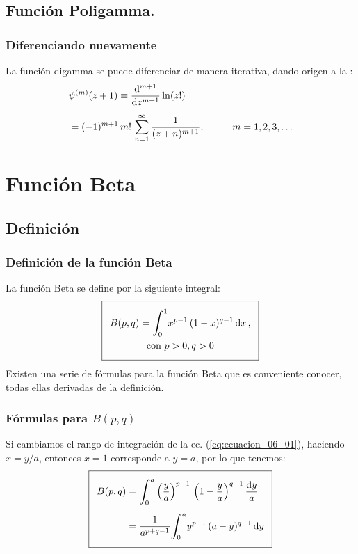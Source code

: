 \documentclass[12pt]{beamer}
\begin{document}
\subsection*{Función Poligamma.}

\begin{frame}
\frametitle{Diferenciando nuevamente}
La función digamma se puede diferenciar de manera iterativa, dando origen a la :
\pause
\begin{align}
\begin{aligned}
&{\psi}^{(m)} (z + 1) \equiv \dv[m+1]{z} \ln(z!) = \\[0.5em]
&= (-1)^{m+1} \, m! \,\sum_{n=1}^{\infty} \dfrac{1}{(z + n)^{m+1}}, \hspace{1cm} m = 1, 2, 3, \ldots
\end{aligned}
\label{eq:ecuacion_10_41}
\end{align}
\end{frame}
\section{Función Beta}
\subsection{Definición}
\begin{frame}[fragile]
\frametitle{Definición de la función Beta}
La función Beta se define por la siguiente integral:
\begin{align} \addtolength{\fboxsep}{5pt}\boxed{
\begin{gathered}
B(p, q) = \scaleint{6ex}_{\bs 0}^{1} x^{p-1} \, (1- x )^{q-1} \dd{x}, \\
\mbox{con }  p > 0, q > 0
\end{gathered}
}
\label{eq:ecuacion_06_01}
\end{align}
\pause
Existen una serie de fórmulas para la función Beta que es conveniente conocer, todas ellas derivadas de la definición.
\end{frame}
\begin{frame}
\frametitle{Fórmulas para $B(p, q)$}
Si cambiamos el rango de integración de la ec. (\ref{eq:ecuacion_06_01}), haciendo $x = y/a$, entonces $x = 1$ corresponde a $y = a$, por lo que tenemos:
\begin{align} \addtolength{\fboxsep}{5pt}\boxed{
\begin{aligned}
B (p, q) &= \scaleint{6ex}_{\bs 0}^{a} \left( \dfrac{y}{a}\right)^{p-1} \, \left( 1 - \dfrac{y}{a}\right)^{q-1} \dfrac{\dd{y}}{a} \\[0.5em]
&= \dfrac{1}{a^{p+q-1}} \scaleint{6ex}_{\bs 0}^{a} y^{p-1} \, (a - y)^{q-1} \dd{y}
\end{aligned}
\label{eq:ecuacion_06_03}
}
\end{align}
\end{frame}
\end{document}
